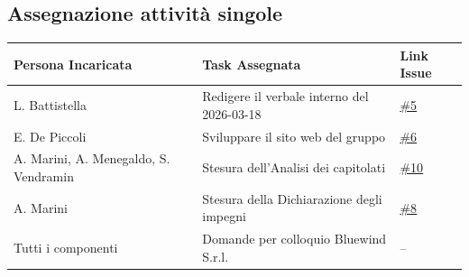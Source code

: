 \documentclass[a4paper, 10pt, colorlinks=true, linkcolor=black, urlcolor=blue, citecolor=blue, hidelinks]{article}
\newcommand{\issue}[1]{\href{https://github.com/thebitless-group-swe/thebitless.github.io/issues/#1}{\##1}}
\begin{document}
\subsection{Assegnazione attività singole}
\begin{center}
\renewcommand{\arraystretch}{1.4}
\begin{tabular}{|p{4.2cm}|p{6.2cm}|p{2.2cm}|}
\hline
\textbf{Persona Incaricata} & \textbf{Task Assegnata} & \centering\textbf{Link Issue} \tabularnewline
\hline
L. Battistella & Redigere il verbale interno del 2026-03-18 & \centering \issue{5} \tabularnewline
\hline
E. De Piccoli & Sviluppare il sito web del gruppo & \centering  \issue{6} \tabularnewline
\hline
A. Marini, A. Menegaldo, S. Vendramin & Stesura dell'Analisi dei capitolati & \centering \issue{10} \tabularnewline
\hline
A. Marini & Stesura della Dichiarazione degli impegni & \centering \issue{8} \tabularnewline
\hline
Tutti i componenti & Domande per colloquio Bluewind S.r.l. & \centering -- \tabularnewline
\hline
\end{tabular}
\end{center}
\end{document}

